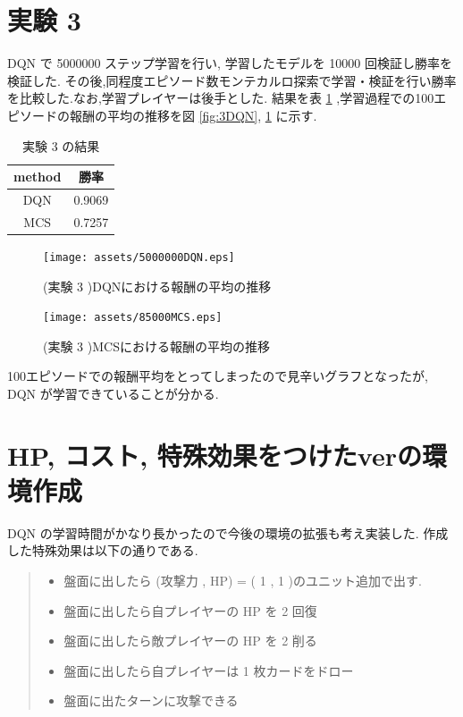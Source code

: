 \documentclass{jarticle}     %
\begin{document}
\section{実験 3}
DQN で 5000000 ステップ学習を行い, 学習したモデルを 10000 回検証し勝率を検証した. その後,同程度エピソード数モンテカルロ探索で学習・検証を行い勝率を比較した.なお,学習プレイヤーは後手とした.
結果を表 \ref{table:jikkenDQN} ,学習過程での100エピソードの報酬の平均の推移を図 \ref{fig:3DQN}, \ref{fig:3MCS} に示す.

\begin{table}[H]
  \centering
  \caption{実験 3 の結果}
  \label{table:jikkenDQN}
  \begin{tabular}{|c|c|}
  \hline
  method & 勝率     \\ \hline
  DQN      & 0.9069 \\ \hline
  MCS      & 0.7257 \\ \hline
  \end{tabular}
  \end{table}

  \begin{figure}[H]
    \begin{minipage}[b]{0.52\linewidth}
      \centering
      \texttt{[image: assets/5000000DQN.eps]}
      \caption{(実験 3 )DQNにおける報酬の平均の推移}
      \label{fig:3DQN}
    \end{minipage}
    \begin{minipage}[b]{0.52\linewidth}
      \centering
      \texttt{[image: assets/85000MCS.eps]}
      \caption{(実験 3 )MCSにおける報酬の平均の推移}
      \label{fig:3MCS}
    \end{minipage}
  \end{figure}

100エピソードでの報酬平均をとってしまったので見辛いグラフとなったが, DQN が学習できていることが分かる.



\section{HP, コスト, 特殊効果をつけたverの環境作成}
DQN の学習時間がかなり長かったので今後の環境の拡張も考え実装した.
作成した特殊効果は以下の通りである.
\begin{quote}
  \begin{itemize}
   \item 盤面に出したら (攻撃力 , HP) = ( 1 , 1 )のユニット追加で出す.
   \item 盤面に出したら自プレイヤーの HP を 2 回復
   \item 盤面に出したら敵プレイヤーの HP を 2 削る
   \item 盤面に出したら自プレイヤーは 1 枚カードをドロー
   \item 盤面に出たターンに攻撃できる
  \end{itemize}
 \end{quote}
\end{document}
